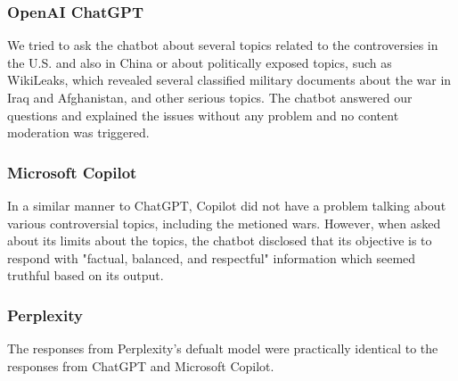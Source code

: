 \subsubsection*{OpenAI ChatGPT}

We tried to ask the chatbot about several topics related to the controversies in the U.S. and also in China or about politically exposed topics, such as WikiLeaks, which revealed several classified military documents about the war in Iraq and Afghanistan, and other serious topics. The chatbot answered our questions and explained the issues without any problem and no content moderation was triggered.

\subsubsection*{Microsoft Copilot}

In a similar manner to ChatGPT, Copilot did not have a problem talking about various controversial topics, including the metioned wars. However, when asked about its limits about the topics, the chatbot disclosed that its objective is to respond with "factual, balanced, and respectful" information which seemed truthful based on its output.

\subsubsection*{Perplexity}

The responses from Perplexity's defualt model were practically identical to the responses from ChatGPT and Microsoft Copilot.





